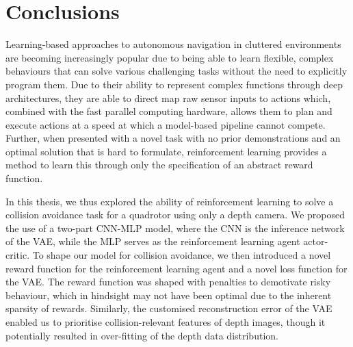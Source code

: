 \chapter{Conclusions}
\label{chap:10_conclusions}
\begin{comment}
A concise summary of essential information and findings in the project.
\end{comment}

Learning-based approaches to autonomous navigation in cluttered environments are becoming increasingly popular due to being able to learn flexible, complex behaviours that can solve various challenging tasks without the need to explicitly program them. Due to their ability to represent complex functions through deep architectures, they are able to direct map raw sensor inputs to actions which, combined with the fast parallel computing hardware, allows them to plan and execute actions at a speed at which a model-based pipeline cannot compete.
Further, when presented with a novel task with no prior demonstrations and an optimal solution that is hard to formulate, reinforcement learning provides a method to learn this through only the specification of an abstract reward function.

In this thesis, we thus explored the ability of reinforcement learning to solve a collision avoidance task for a quadrotor using only a depth camera. We proposed the use of a two-part CNN-MLP model, where the CNN is the inference network of the VAE, while the MLP serves as the reinforcement learning agent actor-critic. To shape our model for collision avoidance, we then introduced a novel reward function for the reinforcement learning agent and a novel loss function for the VAE. The reward function was shaped with penalties to demotivate risky behaviour, which in hindsight may not have been optimal due to the inherent sparsity of rewards. Similarly, the customised reconstruction error of the VAE enabled us to prioritise collision-relevant features of depth images, though it potentially resulted in over-fitting of the depth data distribution.

